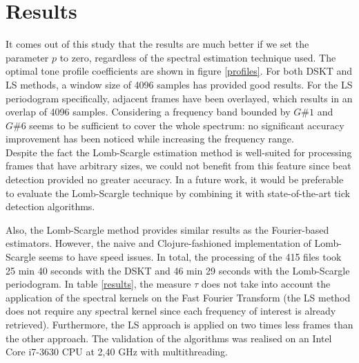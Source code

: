 \documentclass[letterpaper]{article}
\begin{document}
\section{Results}

It comes out of this study that the results are much better if we set the parameter $p$ to zero, regardless of the spectral estimation technique used.
The optimal tone profile coefficients are shown in figure \ref{profiles}. For both DSKT and LS methods, a window size of 4096 samples has provided good results. For the LS periodogram specifically, adjacent frames have been overlayed, which results in an overlap of 4096 samples.
Considering a frequency band bounded by $G\#1$ and $G\#6$ seems to be sufficient to cover the whole spectrum: no significant accuracy improvement has been noticed while increasing the frequency range.\\

Despite the fact the Lomb-Scargle estimation method is well-suited for processing frames that have arbitrary sizes, we could not benefit from this feature since beat detection provided no greater accuracy. In a future work, it would be preferable to evaluate the Lomb-Scargle technique by combining it with state-of-the-art tick detection algorithms. \\

\begin{table}
\vskip 0.25cm
\caption{Accuracy assessment, according to the raw accuracy and the MIREX index. DSKT stands for Direct Spectral Kernel Transform and
LS for Lomb-Scargle periodogram. $\tau$ represents the average clock time required to compute the spectrum of a frame of 4096 samples.
The library JTransforms (with the fastest Java implementation of the FFT) has been used for the purpose of the comparison.}
\label{results}
\end{table}

Also, the Lomb-Scargle method provides similar results as the Fourier-based estimators. However, the naive and Clojure-fashioned implementation of Lomb-Scargle seems to have speed issues. In total, the processing of the 415 files took 25 min 40 seconds with the DSKT and 46 min 29 seconds with the Lomb-Scargle periodogram. In table \ref{results}, the measure $\tau$ does not take into account the application of the spectral kernels on the Fast Fourier Transform (the LS method does not require any spectral kernel since each frequency of interest is already retrieved). Furthermore, the LS approach is applied on two times less frames than the other approach. The validation of the algorithms was realised on an Intel Core i7-3630 CPU at 2,40 GHz with multithreading.\\
\end{document}
